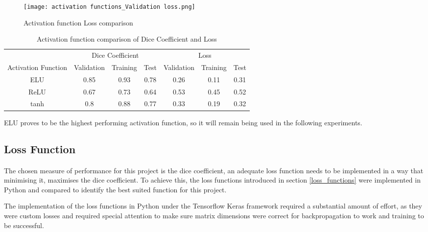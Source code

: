 \begin{figure}[hbt!]
    \centering
    \texttt{[image: activation functions\_Validation loss.png]}
    \caption{Activation function Loss comparison}
    \label{act_dice}
\end{figure}

\begin{table}[ht!]
    \begin{center}
    \begin{tabular}{ccccccc}
        \toprule
       & \multicolumn{3}{c}{Dice Coefficient}     & \multicolumn{3}{c}{Loss} \\
    Activation Function & Validation & Training & Test & Validation & Training & Test \\
    \rowcolor{lightgray} \gls{ELU} & 0.85 & 0.93 & 0.78 & 0.26 & 0.11 & 0.31  \\ \gls{ReLU} & 0.67 & 0.73 & 0.64 & 0.53 & 0.45 & 0.52  \\ tanh & 0.8 & 0.88 & 0.77 & 0.33 & 0.19 & 0.32  \\
                    \bottomrule
    \end{tabular}
    \caption{Activation function comparison of Dice Coefficient and Loss} \label{tab_act}
  \end{center}
\end{table}

\gls{ELU} proves to be the highest performing activation function, so it will remain being used in the following experiments.

\subsection{Loss Function} \label{loss_exp}
\paragraph{}
The chosen measure of performance for this project is the dice coefficient, an adequate loss function needs to be implemented in a way that minimising it, maximises the dice coefficient. To achieve this, the loss functions introduced in section \ref{loss_functions} were implemented in Python and compared to identify the best suited function for this project.

The implementation of the loss functions in Python under the Tensorflow Keras framework required a substantial amount of effort, as they were custom losses and required special attention to make sure matrix dimensions were correct for backpropagation to work and training to be successful. 

